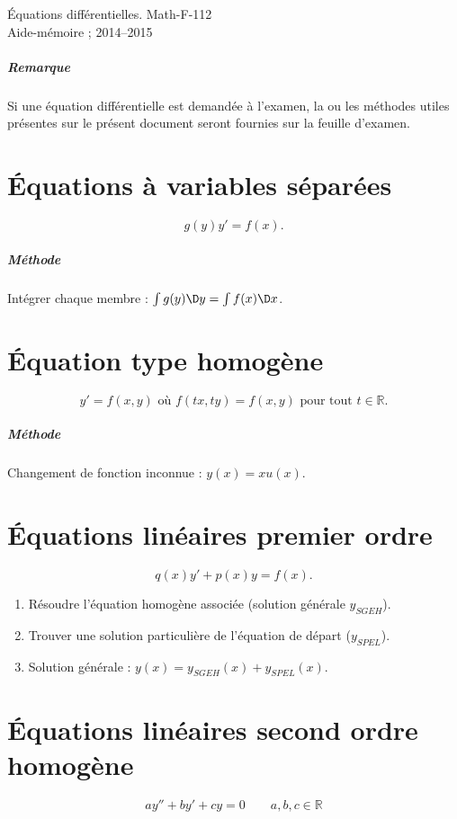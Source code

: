 \documentclass[french,oneside,twocolumn,article]{memoir} %
\newcommand*{\ens}[1]{\mathbb{#1}} %
\newcommand*{\RR}{\ens R}%
\def\methode{\paragraph{Méthode}}
\begin{document}
\begin{center}
  Équations différentielles. Math-F-112\\
  Aide-mémoire ;  2014--2015
\end{center}

\paragraph{Remarque}
Si une équation différentielle est demandée à l'examen, la ou les méthodes utiles présentes sur le présent document seront fournies sur la feuille d'examen.

\chapter{Équations à variables séparées}
\begin{equation*}
  g(y) y' = f(x).
\end{equation*}

\methode{} Intégrer chaque membre : $\int g(y)\D y = \int f(x) \D x$.

\chapter{Équation type homogène}
\begin{equation*}
  y' = f(x,y) \text{ où $f(tx,ty) = f(x,y)$ pour tout $t \in \RR$.}
\end{equation*}

\methode{} Changement de fonction inconnue : \(y(x) = x u(x)\).

\chapter{Équations linéaires premier ordre}
\begin{equation*}
  q(x) y' +  p(x) y = f(x) \tag{EL}.
\end{equation*}

\begin{enumerate}
\item Résoudre l'équation homogène associée (solution générale $y_{SGEH}$).
\item Trouver une solution particulière de l'équation de départ ($y_{SPEL}$).
\item Solution générale : $y(x) = y_{SGEH}(x) + y_{SPEL}(x)$.
\end{enumerate}
\chapter{Équations linéaires second ordre homogène}
\label{second-ordre-lin-homogene}
\begin{equation*}
  a y'' + by' + cy = 0 \qquad a,b,c\in \RR
\end{equation*}
\end{document}
